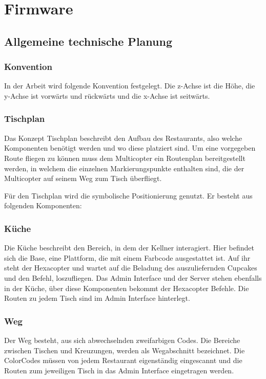 \chapter{Firmware}
\renewcommand{\kapitelautor}{Autor: Christina Bornberg}

\section{Allgemeine technische Planung}

  \subsection{Konvention}
  In der Arbeit wird folgende Konvention festgelegt. Die z-Achse ist die Höhe, die y-Achse ist vorwärts und rückwärts und die x-Achse ist seitwärts.


  \subsection{Tischplan}
  Das Konzept Tischplan beschreibt den Aufbau des Restaurants, also welche Komponenten benötigt werden und wo diese platziert sind.
  Um eine vorgegeben Route fliegen zu können muss dem Multicopter ein Routenplan bereitgestellt werden, in welchem die einzelnen Markierungspunkte enthalten sind, die der Multicopter auf seinem Weg zum Tisch überfliegt.

  Für den Tischplan wird die symbolische Positionierung genutzt. Er besteht aus folgenden Komponenten:

  \subsection*{Küche}
  Die Küche beschreibt den Bereich, in dem der Kellner interagiert. Hier befindet sich die Base, eine Plattform, die mit einem Farbcode ausgestattet ist. Auf ihr steht der Hexacopter und wartet auf die Beladung des auszuliefernden Cupcakes und den Befehl, loszufliegen.
  Das Admin Interface und der Server stehen ebenfalls in der Küche, über diese Komponenten bekommt der Hexacopter Befehle. Die Routen zu jedem Tisch sind im Admin Interface hinterlegt.

  \subsection*{Weg}
  Der Weg besteht, aus sich abwechselnden zweifarbigen Codes. Die Bereiche zwischen Tischen und Kreuzungen, werden als Wegabschnitt bezeichnet. Die ColorCodes müssen von jedem Restaurant eigenständig eingescannt und die Routen zum jeweiligen Tisch in das Admin Interface eingetragen werden.

